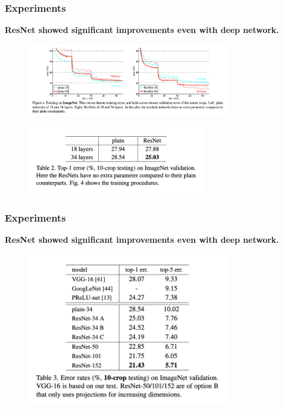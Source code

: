 \documentclass[
	11pt, %
]{beamer}
\begin{document}
\begin{frame}
	\frametitle{Experiments}

	\textbf{ResNet showed significant improvements even with deep network.}

	\begin{figure}
		\centering
		\includegraphics[width=0.8\textwidth]{./images/Screenshot 2025-05-20 at 0.33.26.png}
	\end{figure}

	\begin{figure}
		\centering
		\includegraphics[width=0.7\textwidth]{./images/Screenshot 2025-05-20 at 0.33.49.png}
	\end{figure}
\end{frame}

\begin{frame}
	\frametitle{Experiments}

	\textbf{ResNet showed significant improvements even with deep network.}

	\begin{figure}
		\centering
		\includegraphics[width=0.8\textwidth]{./images/Screenshot 2025-05-20 at 0.34.01.png}
	\end{figure}
\end{frame}
\end{document}
